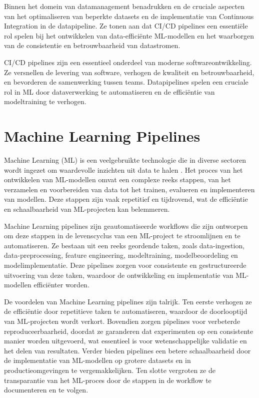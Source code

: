 
Binnen het domein van datamanagement benadrukken \textcite{Samad2018} en \textcite{Vadavalasa2020} de cruciale aspecten van het optimaliseren van beperkte datasets en de implementatie van Continuous Integration in de datapipeline. Ze tonen aan dat CI/CD pipelines een essentiële rol spelen bij het ontwikkelen van data-efficiënte ML-modellen en het waarborgen van de consistentie en betrouwbaarheid van datastromen.

CI/CD pipelines zijn een essentieel onderdeel van moderne softwareontwikkeling. Ze versnellen de levering van software, verhogen de kwaliteit en betrouwbaarheid, en bevorderen de samenwerking tussen teams. Datapipelines spelen een cruciale rol in ML door dataverwerking te automatiseren en de efficiëntie van modeltraining te verhogen.
\section{Machine Learning Pipelines}

Machine Learning (ML) is een veelgebruikte technologie die in diverse sectoren wordt ingezet om waardevolle inzichten uit data te halen \citep{Jordan2015}. Het proces van het ontwikkelen van ML-modellen omvat een complexe reeks stappen, van het verzamelen en voorbereiden van data tot het trainen, evalueren en implementeren van modellen. Deze stappen zijn vaak repetitief en tijdrovend, wat de efficiëntie en schaalbaarheid van ML-projecten kan belemmeren.

Machine Learning pipelines zijn geautomatiseerde workflows die zijn ontworpen om deze stappen in de levenscyclus van een ML-project te stroomlijnen en te automatiseren. Ze bestaan uit een reeks geordende taken, zoals data-ingestion, data-preprocessing, feature engineering, modeltraining, modelbeoordeling en modelimplementatie. Deze pipelines zorgen voor consistente en gestructureerde uitvoering van deze taken, waardoor de ontwikkeling en implementatie van ML-modellen efficiënter worden.

De voordelen van Machine Learning pipelines zijn talrijk. Ten eerste verhogen ze de efficiëntie door repetitieve taken te automatiseren, waardoor de doorlooptijd van ML-projecten wordt verkort. Bovendien zorgen pipelines voor verbeterde reproduceerbaarheid, doordat ze garanderen dat experimenten op een consistente manier worden uitgevoerd, wat essentieel is voor wetenschappelijke validatie en het delen van resultaten. Verder bieden pipelines een betere schaalbaarheid door de implementatie van ML-modellen op grotere datasets en in productieomgevingen te vergemakkelijken. Ten slotte vergroten ze de transparantie van het ML-proces door de stappen in de workflow te documenteren en te volgen.

